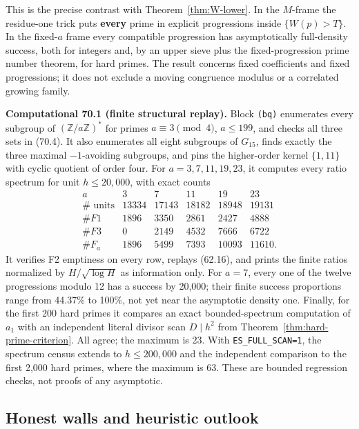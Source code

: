 \documentclass[10pt,reqno]{amsart}
\theoremstyle{definition}
\newcommand{\1}{\mathbf 1}
\begin{document}
This is the precise contrast with Theorem~\ref{thm:W-lower}.  In the $M$-frame the
residue-one trick puts \textbf{every} prime in explicit progressions inside
$\{W(p)>T\}$.  In the fixed-$a$ frame every compatible progression has
asymptotically full-density success, both for integers and, by an upper
sieve plus the fixed-progression prime number theorem, for hard primes.
The result concerns fixed coefficients and fixed progressions; it does not
exclude a moving congruence modulus or a correlated growing family.

\medskip\noindent\textbf{Computational 70.1 (finite structural replay).}  Block \texttt{(bq)} enumerates
every subgroup of $(\mathbb Z/a\mathbb Z)^*$ for primes
$a\equiv3\pmod4$, $a\leq199$, and checks all three sets in (70.4).
It also enumerates all eight subgroups of $G_{15}$, finds exactly the
three maximal $-1$-avoiding subgroups, and pins the higher-order kernel
$\{1,11\}$ with cyclic quotient of order four.  For
$a=3,7,11,19,23$, it computes every ratio spectrum for unit
$h\leq20,000$, with exact counts
\begin{equation}
\begin{array}{c|rrrrr}
 a&3&7&11&19&23\\ \hline
 \#\text{ units}&13334&17143&18182&18948&19131\\
 \#F1&1896&3350&2861&2427&4888\\
 \#F3&0&2149&4532&7666&6722\\
 \#F_a&1896&5499&7393&10093&11610.
\end{array}                                                \tag{70.36}
\end{equation}
It verifies F2 emptiness on every row, replays (62.16), and prints the
finite ratios normalized by $H/\sqrt{\log H}$ as information only.  For
$a=7$, every one of the twelve progressions modulo 12 has a success by
20,000; their finite success proportions range from 44.37\% to 100\%, not yet
near the asymptotic density one.  Finally, for the first 200 hard primes it
compares an exact bounded-spectrum computation of $a_1$ with an
independent literal divisor scan $D\mid h^2$ from Theorem~\ref{thm:hard-prime-criterion}.  All agree;
the maximum is 23.  With \texttt{ES\_FULL\_SCAN=1}, the spectrum census extends to
$h\leq200,000$ and the independent comparison to the first 2,000 hard
primes, where the maximum is 63.  These are bounded regression checks, not
proofs of any asymptotic.

\subsection{Honest walls and heuristic outlook}
\end{document}
